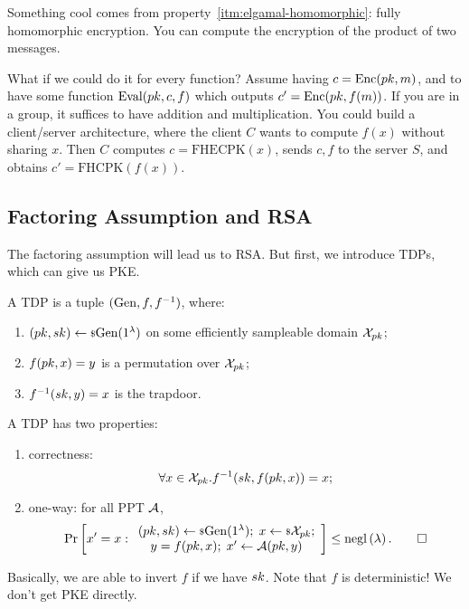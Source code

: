 Something cool comes from property~\ref{itm:elgamal-homomorphic}: fully homomorphic encryption.
You can compute the encryption of the product of two messages.

What if we could do it for every function?
Assume having $c = \mathrm{Enc}(pk, m)$, and to have some function $\mathrm{Eval}(pk, c, f)$ which outputs $c' = \mathrm{Enc}(pk, f(m))$.
If you are in a group, it suffices to have addition and multiplication.
You could build a client/server architecture, where the client $C$ wants to compute $f(x)$ without sharing $x$.
Then $C$ computes $c = \mathrm{FHECPK}(x)$, sends $c,f$ to the server $S$, and obtains $c' = \mathrm{FHCPK}(f(x))$.

\subsection{Factoring Assumption and \acs{RSA}}

The factoring assumption will lead us to \ac{RSA}.
But first, we introduce \acp{TDP}, which can give us \ac{PKE}.

\begin{definition}
	A \ac{TDP} is a tuple $(\mathrm{Gen}, f, f^{-1})$, where:
	\begin{enumerate}
		\item $(pk, sk) \leftarrow {\scriptstyle \$} {\mathrm{Gen}(1^{\lambda})}$ on some efficiently sampleable domain $\mathcal{X}_{pk}$;
		\item $f(pk, x) = y$ is a permutation over $\mathcal{X}_{pk}$;
		\item $f^{-1}(sk, y) = x$ is the trapdoor.
	\end{enumerate}
	A \ac{TDP} has two properties:
	\begin{enumerate}
		\item correctness:
			\begin{equation*}
				\forall x \in \mathcal{X}_{pk} . f^{-1}(sk, f(pk, x)) = x;
			\end{equation*}
		\item one-way: for all \ac{PPT} $\mathcal{A}$,
			\begin{equation*}
				\mathop{\mathrm{Pr}}\limits_{} \left[ {
					x' = x :
					\begin{array}{c}
					(pk, sk) \leftarrow {\scriptstyle \$} {\mathrm{Gen}(1^{\lambda})}; \;
					x \leftarrow {\scriptstyle \$} {\mathcal{X}_{pk}}; \\
					y = f(pk, x); \;
					x' \leftarrow \mathcal{A}(pk, y)
					\end{array}
				} \right]
				\le \mathrm{negl}\left({\lambda}\right).
				\qedhere
			\end{equation*}
	\end{enumerate}
\end{definition}
Basically, we are able to invert $f$ if we have $sk$.
Note that $f$ is deterministic!
We don't get \ac{PKE} directly.

